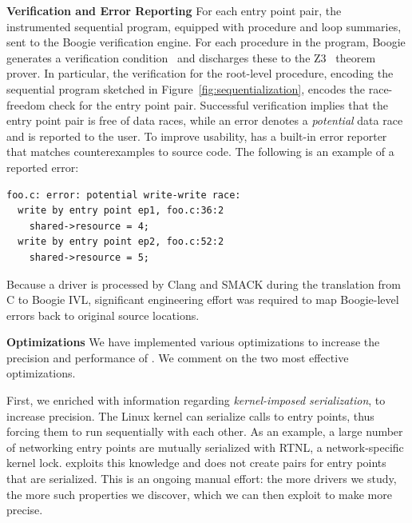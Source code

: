 \medskip\noindent\textbf{Verification and Error Reporting }
%
For each entry point pair, the instrumented sequential program, equipped with procedure and loop summaries, sent to the Boogie verification engine.  For each procedure in the program, Boogie generates a verification condition~\cite{barnett2005weakest} and discharges these to the Z3~\cite{de2008z3} theorem prover.  In particular, the verification for the root-level procedure, encoding the sequential program sketched in Figure~\ref{fig:sequentialization}, encodes the race-freedom check for the entry point pair.
Successful verification implies that the entry point pair is free of data races, while an error denotes a \emph{potential} data race and is reported to the user. To improve usability, \whoop has a built-in error reporter that matches counterexamples to source code. The following is an example of a reported error: 

\begin{lstlisting}
foo.c: error: potential write-write race:
  write by entry point ep1, foo.c:36:2
    shared->resource = 4;
  write by entry point ep2, foo.c:52:2
    shared->resource = 5;
\end{lstlisting}

Because a driver is processed by Clang and SMACK during the translation from C to Boogie IVL, significant engineering effort was required to map Boogie-level errors back to original source locations.

\medskip\noindent\textbf{Optimizations }
%
We have implemented various optimizations to increase the precision and performance of \whoop.  We comment on the two most effective optimizations.

First, we enriched \whoop with information regarding \emph{kernel-imposed serialization}, to increase precision. The Linux kernel can serialize calls to entry points, thus forcing them to run sequentially with each other. As an example, a large number of networking entry points are mutually serialized with RTNL, a network-specific kernel lock. \whoop exploits this knowledge and does not create pairs for entry points that are serialized. This is an ongoing manual effort: the more drivers we study, the more such properties we discover, which we can then exploit to make \whoop more precise.  


